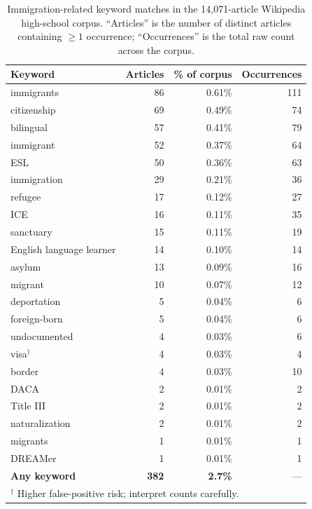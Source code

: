 \documentclass[11pt]{article}
\begin{document}
\begin{table}[htbp]
  \centering
  \footnotesize
  \setlength{\tabcolsep}{1.5pt}
  \begin{tabular}{lrrr}
  \toprule
  Keyword & Articles & \% of corpus & Occurrences \\
  \midrule
    immigrants               & 86  & 0.61\% & 111 \\
    citizenship              & 69  & 0.49\% &  74 \\
    bilingual                & 57  & 0.41\% &  79 \\
    immigrant                & 52  & 0.37\% &  64 \\
    ESL                      & 50  & 0.36\% &  63 \\
    immigration              & 29  & 0.21\% &  36 \\
    refugee                  & 17  & 0.12\% &  27 \\
    ICE                      & 16  & 0.11\% &  35 \\
    sanctuary                & 15  & 0.11\% &  19 \\
    English language learner & 14  & 0.10\% &  14 \\
    asylum                   & 13  & 0.09\% &  16 \\
    migrant                  & 10  & 0.07\% &  12 \\
    deportation              &  5  & 0.04\% &   6 \\
    foreign-born             &  5  & 0.04\% &   6 \\
    undocumented             &  4  & 0.03\% &   6 \\
    visa$^\dagger$           &  4  & 0.03\% &   4 \\
    border                   &  4  & 0.03\% &  10 \\
    DACA                     &  2  & 0.01\% &   2 \\
    Title III                &  2  & 0.01\% &   2 \\
    naturalization           &  2  & 0.01\% &   2 \\
    migrants                 &  1  & 0.01\% &   1 \\
    DREAMer                  &  1  & 0.01\% &   1 \\
    \midrule
    \textbf{Any keyword}     & \textbf{382} & \textbf{2.7\%} & --- \\
    \bottomrule
    \multicolumn{4}{l}{\footnotesize $^\dagger$ Higher false-positive risk; interpret counts carefully.} \\
  \end{tabular}
  \caption{Immigration-related keyword matches in the 14{,}071-article Wikipedia high-school corpus. ``Articles'' is the number of distinct articles containing $\geq 1$ occurrence; ``Occurrences'' is the total raw count across the corpus.}
  \label{tab:wiki_immigration_keywords}
\end{table}
\end{document}
